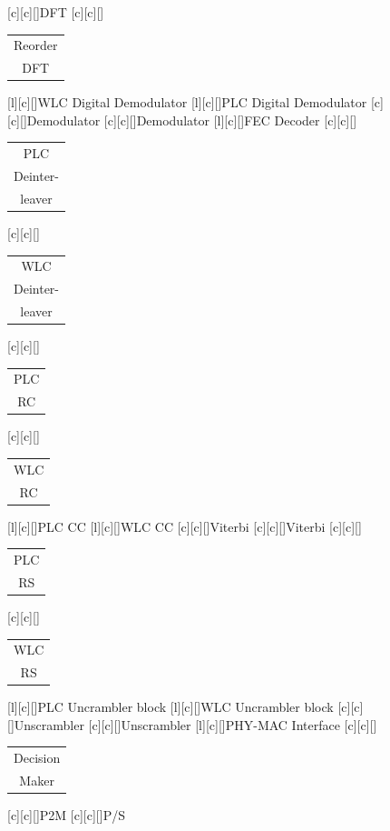 \documentclass[mathserif]{beamer}
\begin{document}
\begin{frame}
\begin{overprint}
{\begin{figure}[htb]
				[c][c][\sizeLetter]{DFT}
				[c][c][\sizeLetter]{\begin{tabular}{c}
						Reorder\\DFT
				\end{tabular}}
				[l][c][\sizeLetter]{WLC Digital Demodulator}
				[l][c][\sizeLetter]{PLC Digital Demodulator}
				[c][c][\sizeLetter]{Demodulator}
				[c][c][\sizeLetter]{Demodulator}
				[l][c][\sizeLetter]{FEC Decoder}
				[c][c][\sizeLetter]{\begin{tabular}{c}
						PLC\\Deinter-\\leaver
				\end{tabular}}
				[c][c][\sizeLetter]{\begin{tabular}{c}
						WLC\\Deinter-\\leaver
				\end{tabular}}
				[c][c][\sizeLetter]{\begin{tabular}{c}
						PLC\\RC
				\end{tabular}}
				[c][c][\sizeLetter]{\begin{tabular}{c}
						WLC\\RC
				\end{tabular}}
				[l][c][\sizeLetter]{PLC CC}
				[l][c][\sizeLetter]{WLC CC}
				[c][c][\sizeLetter]{Viterbi}
				[c][c][\sizeLetter]{Viterbi}
				[c][c][\sizeLetter]{\begin{tabular}{c}
						PLC\\RS
				\end{tabular}}
				[c][c][\sizeLetter]{\begin{tabular}{c}
						WLC\\RS
				\end{tabular}}
				[l][c][\sizeLetter]{PLC Uncrambler block}
				[l][c][\sizeLetter]{WLC Uncrambler block}
				[c][c][\sizeLetter]{Unscrambler}
				[c][c][\sizeLetter]{Unscrambler}
				[l][c][\sizeLetter]{PHY-MAC Interface}
				[c][c][\sizeLetter]{\begin{tabular}{c}
						Decision\\Maker
				\end{tabular}}
				[c][c][\sizeLetter]{P2M}
				[c][c][\sizeLetter]{P/S}

\end{figure}}
\end{overprint}
\end{frame}
\end{document}
